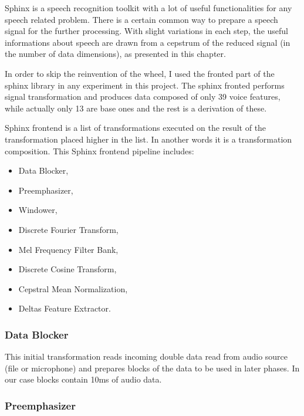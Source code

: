 \documentclass[12pt,a4paper,english]{article}
\begin{document}
Sphinx is a speech recognition toolkit with a lot of useful functionalities for any speech related problem.  \newline
There is a certain common way to prepare a speech signal for the further processing. With slight variations in each step, the useful informations about speech are drawn from a cepstrum of the reduced signal (in the number of data dimensions), as presented in this chapter. \newline

In order to skip the reinvention of the wheel, I used the fronted part of the sphinx library in any experiment in this project.
The sphinx fronted performs signal transformation and produces data composed of only 39 voice features,
while actually only 13 are base ones and the rest is a derivation of these. \newline

Sphinx frontend is a list of transformations executed on the result of the transformation placed higher in the list.
In another words it is a transformation composition. \newline
\newline
This Sphinx frontend pipeline includes: \newline
\begin{itemize}
	\item Data Blocker,
	\item Preemphasizer,
	\item Windower,
	\item Discrete Fourier Transform,
	\item Mel Frequency Filter Bank,
	\item Discrete Cosine Transform,
	\item Cepstral Mean Normalization,
	\item Deltas Feature Extractor.
\end{itemize}

\subsubsection{Data Blocker}

This initial transformation reads incoming double data read from audio source (file or microphone) and
prepares blocks of the data to be used in later phases. In our case blocks contain 10ms of audio data.

\subsubsection{Preemphasizer}
\end{document}
